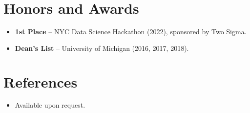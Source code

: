 \documentclass[11pt,a4paper,sans]{moderncv}
\begin{document}

\section{Honors and Awards}
\vspace{1pt}
\begin{itemize}
\item{\textbf{1st Place} -- NYC Data Science Hackathon (2022), sponsored by Two Sigma.}
\item{\textbf{Dean's List} -- University of Michigan (2016, 2017, 2018).}
\end{itemize}


\section{References}
\vspace{1pt}
\begin{itemize}
\item Available upon request.
\end{itemize}
\end{document}
